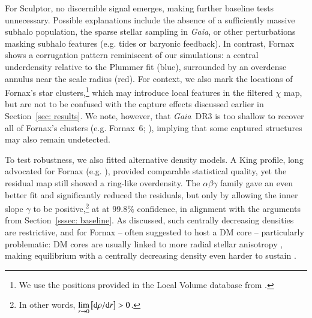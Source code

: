 \documentclass[fleqn,usenatbib]{mnras}
\newcommand{\gaia}{{\sl Gaia}}
\newcommand{\diff}{{\rm d}}
\begin{document}
For Sculptor, no discernible signal emerges, making further baseline tests unnecessary. Possible explanations include the absence of a sufficiently massive subhalo population, the sparse stellar sampling in \gaia, or other perturbations masking subhalo features (e.g. tides or baryonic feedback). In contrast, Fornax shows a corrugation pattern reminiscent of our simulations: a central underdensity relative to the Plummer fit (blue), surrounded by an overdense annulus near the scale radius (red). For context, we also mark the locations of Fornax's star clusters,\footnote{We use the positions provided in the Local Volume database from \cite{Pace+24}.} which may introduce local features in the filtered $\chi$ map, but are not to be confused with the capture effects discussed earlier in Section~\ref{sec: results}. We note, however, that \gaia\ DR3 is too shallow to recover all of Fornax's clusters (e.g. Fornax~6; \citealt{Wang+19-fornax6}), implying that some captured structures may also remain undetected.

To test robustness, we also fitted alternative density models. A King profile, long advocated for Fornax (e.g. \citealt{Battaglia+06,Penarrubia+09}), provided comparable statistical quality, yet the residual map still showed a ring-like overdensity. The $\alpha\beta\gamma$ family gave an even better fit and significantly reduced the residuals, but only by allowing the inner slope $\gamma$ to be positive,\footnote{In other words, $\displaystyle \lim_{r \to 0} \left[ \diff \rho / \diff r \right] > 0$.} at at $99.8\%$ confidence, in alignment with the arguments from Section~\ref{sssec: baseline}. As discussed, such centrally decreasing densities are restrictive, and for Fornax -- often suggested to host a DM core \citep[e.g.][]{Goerdt+06,Walker&Penarrubia&Penarrubia11,Jardel&Gebhardt12,Sanders&Evans20} -- particularly problematic: DM cores are usually linked to more radial stellar anisotropy \citep{vanderMarel+00,Vitral+24,Vitral+25}, making equilibrium with a centrally decreasing density even harder to sustain \citep{Ciotti&Morganti09}.
\end{document}
